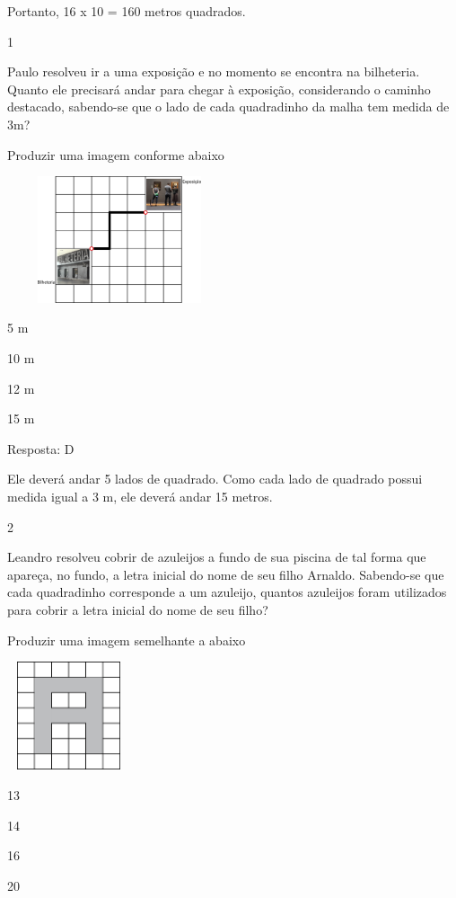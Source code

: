 \begin{escolha}
Portanto, 16 x 10 = 160 metros quadrados.


\num{1}

Paulo resolveu ir a uma exposição e no momento se encontra na
bilheteria. Quanto ele precisará andar para chegar à exposição,
considerando o caminho destacado, sabendo-se que o lado de cada
quadradinho da malha tem medida de 3m?

Produzir uma imagem conforme abaixo

\includegraphics[width=2.60897in,height=1.46587in]{media/image61.png}

\begin{escolha}
\item
  5 m
\item
  10 m
\item
  12 m
\item
  15 m
\end{escolha}

Resposta: D

Ele deverá andar 5 lados de quadrado. Como cada lado de quadrado possui
medida igual a 3 m, ele deverá andar 15 metros.

\num{2}

Leandro resolveu cobrir de azuleijos a fundo de sua piscina de tal forma
que apareça, no fundo, a letra inicial do nome de seu filho Arnaldo.
Sabendo-se que cada quadradinho corresponde a um azuleijo, quantos
azuleijos foram utilizados para cobrir a letra inicial do nome de seu
filho?

Produzir uma imagem semelhante a abaixo

\includegraphics[width=1.42949in,height=1.25160in]{media/image62.png}

\begin{escolha}
\item
  13
\item
  14
\item
  16
\item
  20
\end{escolha}


\end{escolha}
